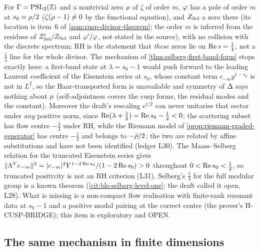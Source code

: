 \begin{observation}
\label{obs:modular-scattering-sector}
For $\Gamma = \mathrm{PSL}_2(\mathbb Z)$ and a nontrivial zero $\rho$ of $\zeta$ of order $m$, $\varphi$ has
a pole of order $m$ at $s_0 = \rho/2$ ($\zeta(\rho-1)\ne0$ by the functional equation), and
$Z_{\mathrm{Sel}}$ a zero there (its location is item~6 of \cref{asm:cusp-divisor-theorem}; the order $m$
is inferred from the residues of $Z_{\mathrm{Sel}}'/Z_{\mathrm{Sel}}$ and $\varphi'/\varphi$, not stated in the
source), with no collision with the discrete spectrum; RH is the statement that \emph{these} zeros lie on $\operatorname{Re} s = \tfrac14$, not a
$\tfrac14$ line for the whole divisor. The mechanism of \cref{thm:selberg-first-band-form} stops
exactly here: a first-band state at $\lambda = s_0-1$ would push forward to the leading Laurent
coefficient of the Eisenstein series at $s_0$, whose constant term $c_{-m}y^{1-s_0}$ is not in
$L^2$, so the Haar-transported form is unavailable and symmetry of $\Delta$ says nothing about $\rho$
(self-adjointness covers the cusp forms, the residual modes and the constant). Moreover the draft's
rescaling $e^{t/2}$ can never unitarise that sector under \emph{any} positive norm, since
$\operatorname{Re}(\lambda+\tfrac12) = \operatorname{Re} s_0-\tfrac12<0$: the scattering subset has flow centre $-\tfrac34$
under RH, while the Riemann model of \cref{prop:riemann-graded-generator} has centre $-\tfrac14$ and
belongs to $-\bar{\rho}/2$; the two are related by affine substitutions and have not been identified
(ledger L30). The Maass--Selberg relation for the truncated Eisenstein series gives
$\|\Lambda^{Y} e_{-m}\|^2 = |c_{-m}|^2Y^{1-2\operatorname{Re} s_0}/(1-2\operatorname{Re} s_0)>0$ throughout $0<\operatorname{Re} s_0<\tfrac12$,
so truncated positivity is not an RH criterion (L31). Selberg's $\tfrac14$ for the full modular
group is a known theorem (\cref{cit:bls-selberg-level-one}; the draft called it open, L28). What
is missing is a
non-compact flow realisation with finite-rank resonant data at $s_0-1$ and a positive modal pairing
at the correct centre (the prover's H-CUSP-BRIDGE); this item is exploratory and OPEN.
\end{observation}

\subsection{The same mechanism in finite dimensions}

